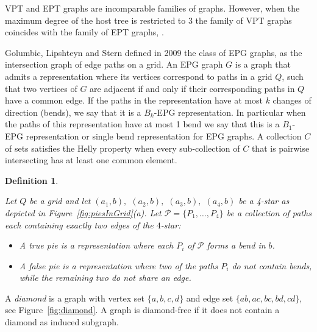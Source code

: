 \documentclass[9pt]{entcs}
\newtheorem{defi}{Definition}[section]
\begin{document}
VPT and EPT graphs are incomparable families of graphs. However, when the maximum degree of the host tree is restricted to 3 the family of
VPT graphs coincides with the family of EPT graphs, \cite{alcon2010necessary}.

 Golumbic, Lipshteyn and Stern defined in 2009 the class of EPG graphs, as the  intersection graph of edge paths on a grid. An EPG graph $G$ is a graph that admits a representation where its vertices correspond to paths in a grid $Q$, such that two vertices of $G$ are adjacent if and only if their corresponding paths in $Q$ have a common edge. If the paths in the representation have at most $k$ changes of direction  (bends), we say that it is a  $B_k$-EPG representation. In particular when the paths of this representation have at most 1 bend we say that this is a $B_1$-EPG representation or single bend representation for EPG graphs.  A collection $C$ of sets satisfies the Helly property when every sub-collection of $C$ that is pairwise intersecting has at least one common element. 


\begin{defi} \label{defi:tortasFrame}

Let $ Q $ be a grid and let $ (a_1, b),$ $(a_2, b),$ $(a_3, b),$ $(a_4, b)$ be a 4-star as depicted in Figure~\ref{fig:piesInGrid}(a). Let $ \mathcal{P} = \{P_1, \dots , P_4\}$ be a collection of paths each containing exactly two edges of the $4$-star:

\begin{itemize}
\item A \emph{true pie} is a representation where each $P_i$ of $ \mathcal{P} $ forms a bend in $b$.

\item A \emph {false pie} is a representation where two of the paths $P_i$ do not contain bends, while the remaining two do not share an edge. 

%


\end{itemize}
\end{defi}


A \textit{diamond} is a graph with vertex set $\{a, b, c, d\}$ and edge set $\{ab, ac,bc, bd,cd\}$, see Figure~\ref{fig:diamond}. A graph is diamond-free if it does not contain a diamond as induced subgraph.
\end{document}
